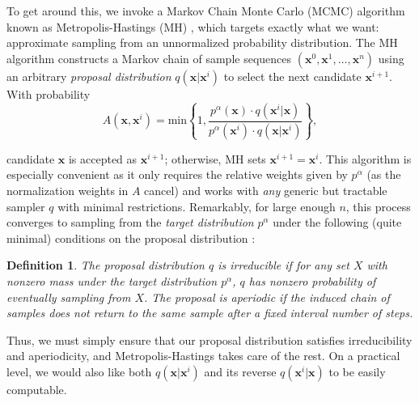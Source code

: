 \documentclass{article}
\newtheorem{definition}{Definition}
\begin{document}
To get around this, we invoke a Markov Chain Monte Carlo (MCMC) algorithm known as Metropolis-Hastings (MH) \citep{metropolis1953equation}, which targets exactly what we want: approximate sampling from an unnormalized probability distribution. The MH algorithm constructs a Markov chain of sample sequences $(\mathbf{x}^0, \mathbf{x}^1, \dots, \mathbf{x}^n)$ using an arbitrary \textit{proposal distribution} $q(\mathbf{x}|\mathbf{x}^i)$ to select the next candidate $\mathbf{x}^{i+1}$. With probability 
% 
\begin{equation}\label{eq:accept}
    A(\mathbf{x}, \mathbf{x}^i) = \text{min} \left\lbrace 1, \frac{p^{\alpha}(\mathbf{x}) \cdot q(\mathbf{x}^i | \mathbf{x})}{p^{\alpha}(\mathbf{x}^i) \cdot q(\mathbf{x}|\mathbf{x}^i)}\right\rbrace,
\end{equation}
 
 candidate $\mathbf{x}$ is accepted as $\mathbf{x}^{i+1}$; otherwise, MH sets $\mathbf{x}^{i+1} = \mathbf{x}^{i}$. This algorithm is especially convenient as it only requires the relative weights given by $p^{\alpha}$ (as the normalization weights in $A$ cancel) and works with \textit{any} generic but tractable sampler $q$ with minimal restrictions. Remarkably, for large enough $n$, this process converges to sampling from the \textit{target distribution} $p^{\alpha}$ under the following (quite minimal) conditions on the proposal distribution \citep{neal1993probabilistic}:

 \begin{definition}
    {\rm The proposal distribution $q$ is \textit{irreducible} if for any set $X$ with nonzero mass under the target distribution $p^{\alpha}$, $q$ has nonzero probability of eventually sampling from $X$. The proposal is \textit{aperiodic} if the induced chain of samples does not return to the same sample after a fixed interval number of steps.}
    \vspace{-2pt}
\end{definition}

Thus, we must simply ensure that our proposal distribution satisfies irreducibility and aperiodicity, and Metropolis-Hastings takes care of the rest. On a practical level, we would also like both $q(\mathbf{x} | \mathbf{x}^i)$ and its reverse $q(\mathbf{x}^i | \mathbf{x})$ to be easily computable. 
\end{document}
